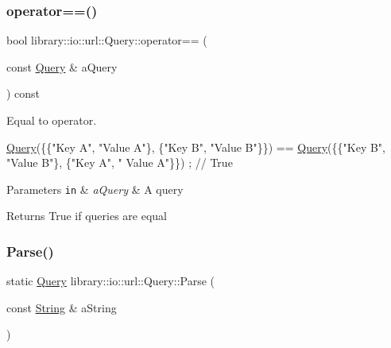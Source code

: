 \subsubsection{\texorpdfstring{operator==()}{operator==()}}
{\footnotesize\ttfamily bool library\+::io\+::url\+::\+Query\+::operator== (\begin{DoxyParamCaption}\item[{const \hyperlink{classlibrary_1_1io_1_1url_1_1_query}{Query} \&}]{a\+Query }\end{DoxyParamCaption}) const}



Equal to operator. 


\begin{DoxyCode}
\hyperlink{classlibrary_1_1io_1_1url_1_1_query_a6781de8f7b7251f8e17c191434b08039}{Query}(\{\{\textcolor{stringliteral}{"Key A"}, \textcolor{stringliteral}{"Value A"}\}, \{\textcolor{stringliteral}{"Key B"}, \textcolor{stringliteral}{"Value B"}\}\}) == \hyperlink{classlibrary_1_1io_1_1url_1_1_query_a6781de8f7b7251f8e17c191434b08039}{Query}(\{\{\textcolor{stringliteral}{"Key B"}, \textcolor{stringliteral}{"Value B"}\}, \{\textcolor{stringliteral}{"Key A"}, \textcolor{stringliteral}{"
      Value A"}\}\}) ; \textcolor{comment}{// True}
\end{DoxyCode}



\begin{DoxyParams}[1]{Parameters}
\mbox{\tt in}  & {\em a\+Query} & A query \\
\hline
\end{DoxyParams}
\begin{DoxyReturn}{Returns}
True if queries are equal 
\end{DoxyReturn}
\mbox{\label{classlibrary_1_1io_1_1url_1_1_query_aaff385aed5f4af758033066e4f7c70a2}} 
\subsubsection{\texorpdfstring{Parse()}{Parse()}}
{\footnotesize\ttfamily static \hyperlink{classlibrary_1_1io_1_1url_1_1_query}{Query} library\+::io\+::url\+::\+Query\+::\+Parse (\begin{DoxyParamCaption}\item[{const \hyperlink{namespacelibrary_1_1io_a7469b45835a4421045db344d6a5a1f85}{String} \&}]{a\+String }\end{DoxyParamCaption})\hspace{0.3cm}{\ttfamily [static]}}



